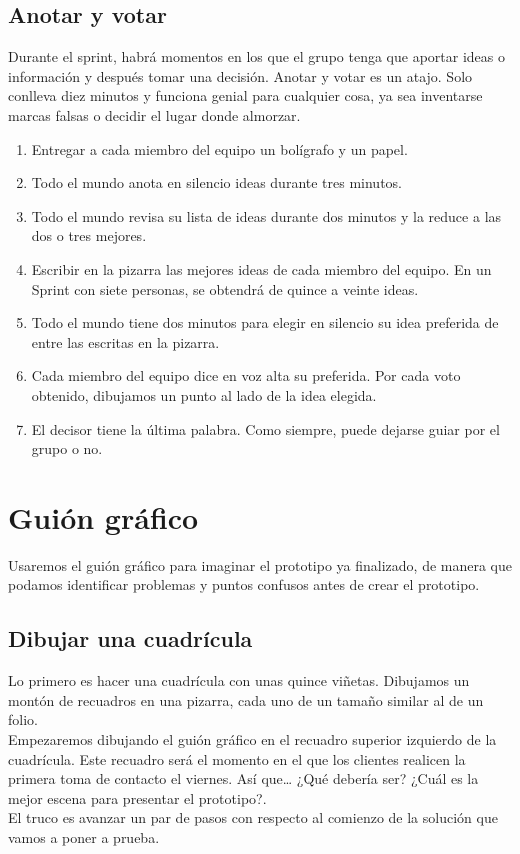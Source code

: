 \documentclass[10pt]{article}
\begin{document}
\begin{multicols}{2}
\subsection*{Anotar y votar}
Durante el sprint, habrá momentos en los que el grupo tenga que aportar ideas o información y después tomar una decisión. Anotar y votar es un atajo. Solo conlleva diez minutos y funciona genial para cualquier cosa, ya sea inventarse marcas falsas o decidir el lugar donde almorzar.
\begin{enumerate}[\bfseries 1.]
\item Entregar a cada miembro del equipo un bolígrafo y un papel.
\item Todo el mundo anota en silencio ideas durante tres minutos.
\item Todo el mundo revisa su lista de ideas durante dos minutos y la reduce a las dos o tres mejores.
\item Escribir en la pizarra las mejores ideas de cada miembro del equipo. En un Sprint con siete personas, se obtendrá de quince a veinte ideas.
\item Todo el mundo tiene dos minutos para elegir en silencio su idea preferida de entre las escritas en la pizarra.
\item Cada miembro del equipo dice en voz alta su preferida. Por cada voto obtenido, dibujamos un punto al lado de la idea elegida.
\item El decisor tiene la última palabra. Como siempre, puede dejarse guiar por el grupo o no.
\end{enumerate}
\section*{Guión gráfico}
Usaremos el guión gráfico para imaginar el prototipo ya finalizado, de manera que podamos identificar problemas y puntos confusos antes de crear el prototipo.
\subsection*{Dibujar una cuadrícula}
Lo primero es hacer una cuadrícula con unas quince viñetas. Dibujamos un montón de recuadros en una pizarra, cada uno de un tamaño similar al de un folio.\\
Empezaremos dibujando el guión gráfico en el recuadro superior izquierdo de la cuadrícula. Este recuadro será el momento en el que los clientes realicen la primera toma de contacto el viernes. Así que… ¿Qué debería ser? ¿Cuál es la mejor escena para presentar el prototipo?.\\
El truco es avanzar un par de pasos con respecto al comienzo de la solución que vamos a poner a prueba.

\end{multicols}
\end{document}
